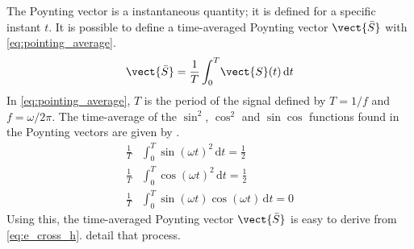 The Poynting vector is a instantaneous quantity; it is defined for a specific instant $t$.
It is possible to define a time-averaged Poynting vector $\vect{\bar{S}}$ with \cref{eq:pointing_average}.
\begin{equation}
    \vect{\bar{S}} = \frac{1}{T}
    \int_0^T \! \vect{S}(t)\, \mathrm{d}t
    \label{eq:pointing_average}
\end{equation}
In \cref{eq:pointing_average}, $T$ is the period of the signal defined by $T=1/f$ and $f=\omega/2\pi$.
The time-average of the $\sin^2$, $\cos^2$ and $\sin\cos$ functions found in the Poynting vectors are given by .
\begin{subequations}
    \begin{align}
        \frac{1}{T} &\int_0^{T} \! \sin(\omega t)^2 \, \mathrm{d}t = \frac{1}{2}
        \label{eq:trig_average_ss}
        \\
        \frac{1}{T} &\int_0^{T} \! \cos(\omega t)^2 \, \mathrm{d}t = \frac{1}{2}
        \label{eq:trig_average_cc}
        \\
        \frac{1}{T} &\int_0^{T} \! \sin(\omega t)\cos(\omega t) \, \mathrm{d}t = 0
        \label{eq:trig_average_sc}
    \end{align}
    \label{eq:trig_average}
\end{subequations}
Using this, the time-averaged Poynting vector $\vect{\bar{S}}$ is easy to derive from \cref{eq:e_cross_h}.
 detail that process.
